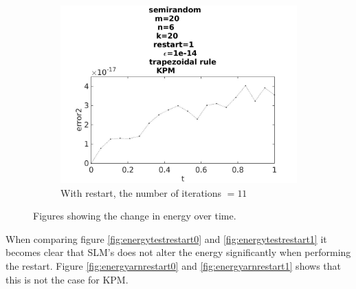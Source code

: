 \begin{figure}[H]
\begin{subfigure}[b]{0.3\textwidth}
                \includegraphics[width=\textwidth]{../MATLAB/fig/errorarnrestart12.jpg}
                \caption{ With restart, the number of iterations $ = 11$ }
                \label{fig:errorarnrestart12}
        \end{subfigure}
        \caption{ Figures showing the change in energy over time. }
        \label{fig:energyarnrestart2next}
\end{figure}

When comparing figure \ref{fig:energytestrestart0} and \ref{fig:energytestrestart1} it becomes clear that SLM's does not alter the energy significantly when performing the restart. Figure \ref{fig:energyarnrestart0} and \ref{fig:energyarnrestart1} shows that this is not the case for KPM.\\